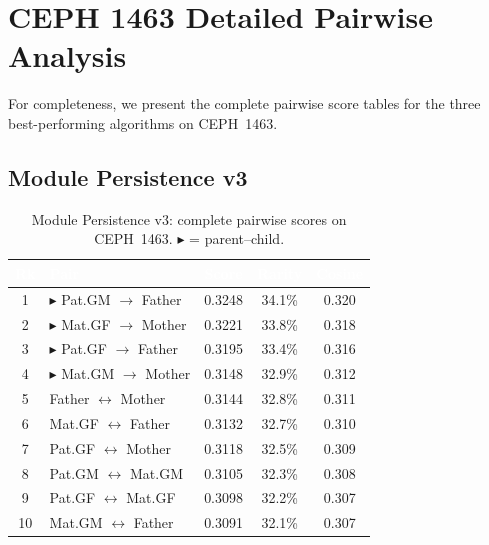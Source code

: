 \documentclass{../yalumba}
\begin{document}
\section{CEPH 1463 Detailed Pairwise Analysis}
\label{sec:pairwise}

For completeness, we present the complete pairwise score tables for
the three best-performing algorithms on CEPH~1463.

\subsection{Module Persistence v3}

\begin{table}[H]
  \centering
  \tablestyle
  \caption{Module Persistence v3: complete pairwise scores on CEPH~1463.
    $\blacktriangleright$ = parent--child.}
  \label{tab:mp_scores}
  \begin{tabular}{clccc}
    \toprule
    \rowcolor{table-header}
    \textcolor{white}{\textbf{Rk}} &
    \textcolor{white}{\textbf{Pair}} &
    \textcolor{white}{\textbf{Score}} &
    \textcolor{white}{\textbf{Rarity}} &
    \textcolor{white}{\textbf{Cosine}} \\
    \midrule
    1 & $\blacktriangleright$ Pat.GM $\to$ Father & 0.3248 & 34.1\% & 0.320 \\
    2 & $\blacktriangleright$ Mat.GF $\to$ Mother & 0.3221 & 33.8\% & 0.318 \\
    3 & $\blacktriangleright$ Pat.GF $\to$ Father & 0.3195 & 33.4\% & 0.316 \\
    4 & $\blacktriangleright$ Mat.GM $\to$ Mother & 0.3148 & 32.9\% & 0.312 \\
    \midrule
    5 & Father $\leftrightarrow$ Mother & 0.3144 & 32.8\% & 0.311 \\
    6 & Mat.GF $\leftrightarrow$ Father & 0.3132 & 32.7\% & 0.310 \\
    7 & Pat.GF $\leftrightarrow$ Mother & 0.3118 & 32.5\% & 0.309 \\
    8 & Pat.GM $\leftrightarrow$ Mat.GM & 0.3105 & 32.3\% & 0.308 \\
    9 & Pat.GF $\leftrightarrow$ Mat.GF & 0.3098 & 32.2\% & 0.307 \\
    10 & Mat.GM $\leftrightarrow$ Father & 0.3091 & 32.1\% & 0.307 \\
    \bottomrule
  \end{tabular}
\end{table}

\end{document}

